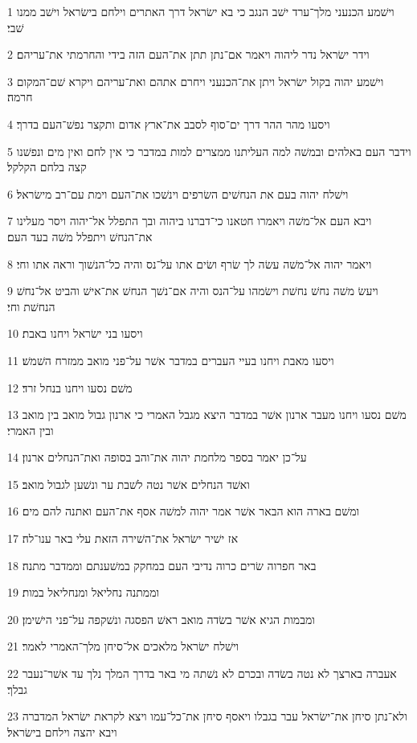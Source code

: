 \par 1 וישׁמע הכנעני מלך־ערד ישׁב הנגב כי בא ישׂראל דרך האתרים וילחם בישׂראל וישׁב ממנו שׁבי׃
\par 2 וידר ישׂראל נדר ליהוה ויאמר אם־נתן תתן את־העם הזה בידי והחרמתי את־עריהם׃
\par 3 וישׁמע יהוה בקול ישׂראל ויתן את־הכנעני ויחרם אתהם ואת־עריהם ויקרא שׁם־המקום חרמה׃
\par 4 ויסעו מהר ההר דרך ים־סוף לסבב את־ארץ אדום ותקצר נפשׁ־העם בדרך׃
\par 5 וידבר העם באלהים ובמשׁה למה העליתנו ממצרים למות במדבר כי אין לחם ואין מים ונפשׁנו קצה בלחם הקלקל׃
\par 6 וישׁלח יהוה בעם את הנחשׁים השׂרפים וינשׁכו את־העם וימת עם־רב מישׂראל׃
\par 7 ויבא העם אל־משׁה ויאמרו חטאנו כי־דברנו ביהוה ובך התפלל אל־יהוה ויסר מעלינו את־הנחשׁ ויתפלל משׁה בעד העם׃
\par 8 ויאמר יהוה אל־משׁה עשׂה לך שׂרף ושׂים אתו על־נס והיה כל־הנשׁוך וראה אתו וחי׃
\par 9 ויעשׂ משׁה נחשׁ נחשׁת וישׂמהו על־הנס והיה אם־נשׁך הנחשׁ את־אישׁ והביט אל־נחשׁ הנחשׁת וחי׃
\par 10 ויסעו בני ישׂראל ויחנו באבת׃
\par 11 ויסעו מאבת ויחנו בעיי העברים במדבר אשׁר על־פני מואב ממזרח השׁמשׁ׃
\par 12 משׁם נסעו ויחנו בנחל זרד׃
\par 13 משׁם נסעו ויחנו מעבר ארנון אשׁר במדבר היצא מגבל האמרי כי ארנון גבול מואב בין מואב ובין האמרי׃
\par 14 על־כן יאמר בספר מלחמת יהוה את־והב בסופה ואת־הנחלים ארנון׃
\par 15 ואשׁד הנחלים אשׁר נטה לשׁבת ער ונשׁען לגבול מואב׃
\par 16 ומשׁם בארה הוא הבאר אשׁר אמר יהוה למשׁה אסף את־העם ואתנה להם מים׃
\par 17 אז ישׁיר ישׂראל את־השׁירה הזאת עלי באר ענו־לה׃
\par 18 באר חפרוה שׂרים כרוה נדיבי העם במחקק במשׁענתם וממדבר מתנה׃
\par 19 וממתנה נחליאל ומנחליאל במות׃
\par 20 ומבמות הגיא אשׁר בשׂדה מואב ראשׁ הפסגה ונשׁקפה על־פני הישׁימן׃
\par 21 וישׁלח ישׂראל מלאכים אל־סיחן מלך־האמרי לאמר׃
\par 22 אעברה בארצך לא נטה בשׂדה ובכרם לא נשׁתה מי באר בדרך המלך נלך עד אשׁר־נעבר גבלך׃
\par 23 ולא־נתן סיחן את־ישׂראל עבר בגבלו ויאסף סיחן את־כל־עמו ויצא לקראת ישׂראל המדברה ויבא יהצה וילחם בישׂראל׃
